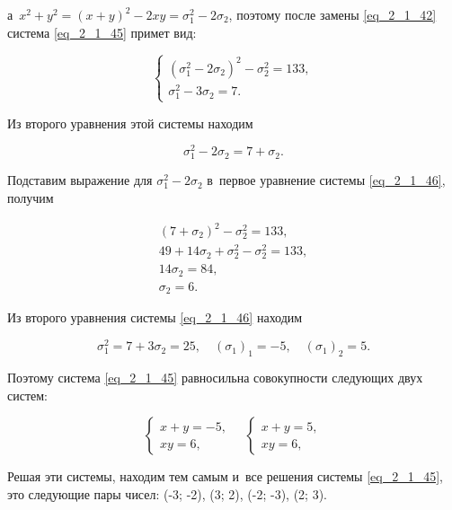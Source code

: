 \noindent
а~$x^{2} + y^{2} = (x + y)^{2} - 2xy = \sigma_{1}^{2} - 2\sigma_{2}$,
поэтому после замены \eqref{eq_2_1_42} система \eqref{eq_2_1_45} примет вид:

\begin{equation}\label{eq_2_1_46}
\begin{cases}
(\sigma_{1}^{2} - 2\sigma_{2})^{2} - \sigma_{2}^{2} = 133, \\
\sigma_{1}^{2} - 3\sigma_{2} = 7.
\end{cases}
\end{equation}

Из второго уравнения этой системы находим

\begin{equation*}
\sigma_{1}^{2} - 2\sigma_{2} = 7 + \sigma_{2}.
\end{equation*}

Подставим выражение для $\sigma_{1}^{2} - 2\sigma_{2}$ в~первое уравнение
системы \eqref{eq_2_1_46}, получим

\begin{gather*}
(7 + \sigma_{2})^{2} - \sigma_{2}^{2} = 133, \\
49 + 14\sigma_{2} + \sigma_{2}^{2} - \sigma_{2}^{2} = 133, \\
14\sigma_{2} = 84, \\
\sigma_{2} = 6.
\end{gather*}

Из второго уравнения системы \eqref{eq_2_1_46} находим

\begin{equation*}
\sigma_{1}^{2} = 7 + 3\sigma_{2} = 25,
\quad
(\sigma_{1})_{1} = -5,
\quad
(\sigma_{1})_{2} = 5.
\end{equation*}

Поэтому система \eqref{eq_2_1_45} равносильна совокупности следующих
двух систем:

\begin{equation*}
\begin{cases}
x + y = -5, \\
xy = 6,
\end{cases}
\quad
\begin{cases}
x + y = 5, \\
xy = 6,
\end{cases}
\end{equation*}

Решая эти системы, находим тем самым и~все решения системы \eqref{eq_2_1_45},
это следующие пары чисел:
(-3; -2), (3; 2), (-2; -3), (2; 3).

